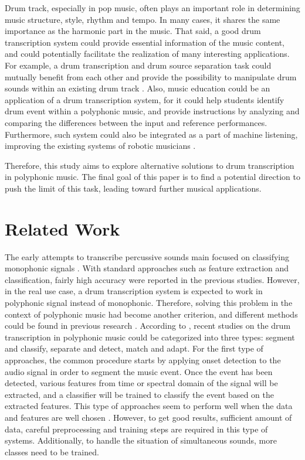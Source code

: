 \documentclass{article}
\begin{document}
Drum track, especially in pop music, often plays an important role in determining music structure, style, rhythm and tempo. In many cases, it shares the same importance as the harmonic part in the music. That said, a good drum transcription system could provide essential information of the music content, and could potentially facilitate the realization of many interesting applications. For example, a drum transcription and drum source separation task could mutually benefit from each other and provide the possibility to manipulate drum sounds within an existing drum track \cite{3,4}.  Also, music education could be an application of a drum transcription system, for it could help students identify drum event within a polyphonic music, and provide instructions by analyzing and comparing the differences between the input and reference performances. Furthermore, such system could also be integrated as a part of machine listening, improving the existing systems of robotic musicians \cite{5}.

Therefore, this study aims to explore alternative solutions to drum transcription in polyphonic music. The final goal of this paper is to find a potential direction to push the limit of this task, leading toward further musical applications.

\section{Related Work}\label{sec:related works}
The early attempts to transcribe percussive sounds main focused on classifying monophonic signals \cite{6,7}. With standard approaches such as feature extraction and classification, fairly high accuracy were reported in the previous studies. However, in the real use case, a drum transcription system is expected to work in polyphonic signal instead of monophonic. Therefore, solving this problem in the context of polyphonic music had become another criterion, and different methods could be found in previous research \cite{8,9,10,11,12,13,14,15}.  According to \cite{15}, recent studies on the drum transcription in polyphonic music could be categorized into three types: segment and classify, separate and detect, match and adapt.  For the first type of approaches, the common procedure starts by applying onset detection to the audio signal in order to segment the music event. Once the event has been detected, various features from time or spectral domain of the signal will be extracted, and a classifier will be trained to classify the event based on the extracted features. This type of approaches seem to perform well when the data and features are well chosen \cite{13,15}. However, to get good results, sufficient amount of data, careful preprocessing and training steps are required in this type of systems. Additionally, to handle the situation of simultaneous sounds, more classes need to be trained.
\end{document}
